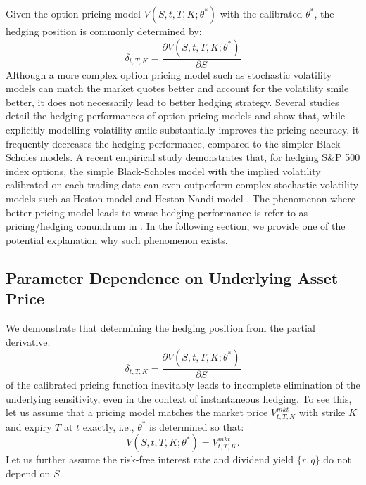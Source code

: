 \documentclass[letterpaper,12pt,titlepage,oneside,final]{book}
\numberwithin{equation}{section}
\theoremstyle{definition}
\newcommand{\Vmkt}{V^{mkt}}
\begin{document}
Given the option pricing model $V(S,t,T,K;\theta^*)$ with the calibrated $\theta^*$, the hedging position is commonly determined by:
\[
\delta_{t,T,K}=  \frac{\partial V(S,t,T,K;\theta^*)}{\partial S}
\]
Although a more complex option pricing model such as stochastic volatility models can match the market quotes better and account for the volatility smile better, it does not necessarily lead to better hedging strategy. 
Several studies \cite{dumas1998implied,bakshi1997empirical,yung2003empirical, lassance2018comparison} detail the hedging performances of option pricing models and show that, while explicitly
modelling volatility smile substantially improves the pricing
accuracy, it frequently decreases the hedging
performance, compared to the simpler  Black-Scholes models. A recent empirical study \cite{lassance2018comparison} demonstrates that, for hedging S\&P 500 index options, the simple Black-Scholes model with the implied volatility calibrated on each trading date can even outperform complex stochastic volatility models such as Heston model \cite{heston1993closed} and Heston-Nandi model \cite{heston2000closed}. The phenomenon where better pricing model leads to worse hedging performance is refer to as pricing/hedging conundrum in \cite{lassance2018comparison}. In the following section, we provide one of the potential explanation why such phenomenon exists.

\subsection{Parameter Dependence on Underlying Asset Price}
\label{sec：dependence}
We demonstrate that determining the hedging position from the partial derivative:
\[
\delta_{t,T,K}=  \frac{\partial V(S,t,T,K;\theta^*)}{\partial S}
\] of the calibrated pricing function inevitably leads to incomplete elimination of the underlying sensitivity, even in the context of instantaneous hedging. 
To see this,
let us assume that a pricing model matches the market price $\Vmkt_{t,T,K}$ with strike $K$ and expiry $T$  at $t$ exactly, i.e., $\theta^*$ is determined so that:
\begin{equation} 
     V(S,t,T,K;\theta^*)=\Vmkt_{t,T,K}.
	 \label{eq:imp2}
\end{equation} 
Let us further assume the risk-free interest rate and dividend yield $\{r,q\}$ do not depend on $S$. 
\end{document}
